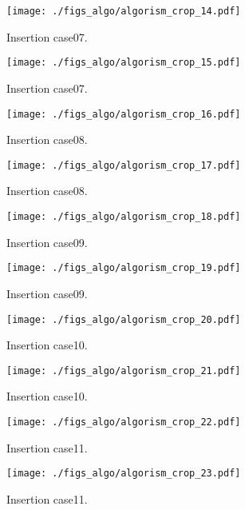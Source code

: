 \begin{figure}[h]
  \texttt{[image: ./figs\_algo/algorism\_crop\_14.pdf]}
  \caption{
    Insertion case07.
  }
\end{figure}
\begin{figure}[h]
  \texttt{[image: ./figs\_algo/algorism\_crop\_15.pdf]}
  \caption{
    Insertion case07.
  }
  \label{fig_IpCHashT_insert_hard_case08}
\end{figure}

\begin{figure}[h]
  \texttt{[image: ./figs\_algo/algorism\_crop\_16.pdf]}
  \caption{
    Insertion case08.
  }
\end{figure}
\begin{figure}[h]
  \texttt{[image: ./figs\_algo/algorism\_crop\_17.pdf]}
  \caption{
    Insertion case08.
  }
  \label{fig_IpCHashT_insert_hard_case08}
\end{figure}

\begin{figure}[h]
  \texttt{[image: ./figs\_algo/algorism\_crop\_18.pdf]}
  \caption{
    Insertion case09.
  }
\end{figure}
\begin{figure}[h]
  \texttt{[image: ./figs\_algo/algorism\_crop\_19.pdf]}
  \caption{
    Insertion case09.
  }
  \label{fig_IpCHashT_insert_hard_case08}
\end{figure}

\begin{figure}[h]
  \texttt{[image: ./figs\_algo/algorism\_crop\_20.pdf]}
  \caption{
    Insertion case10.
  }
\end{figure}
\begin{figure}[h]
  \texttt{[image: ./figs\_algo/algorism\_crop\_21.pdf]}
  \caption{
    Insertion case10.
  }
  \label{fig_IpCHashT_insert_hard_case08}
\end{figure}

\begin{figure}[h]
  \texttt{[image: ./figs\_algo/algorism\_crop\_22.pdf]}
  \caption{
    Insertion case11.
  }
\end{figure}
\begin{figure}[h]
  \texttt{[image: ./figs\_algo/algorism\_crop\_23.pdf]}
  \caption{
    Insertion case11.
  }
  \label{fig_IpCHashT_insert_hard_case08}
\end{figure}


